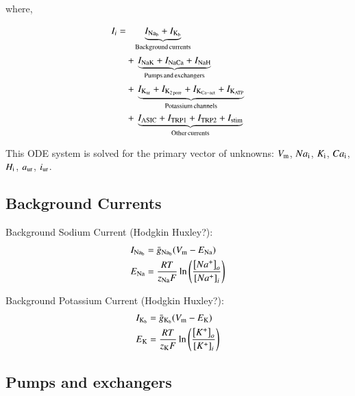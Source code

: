 \noindent where,

\begin{displaymath}
    \begin{split}
      I_{i} =
      & \phantom{+\,} \underbrace{I_{\rm Na_b} + I_{\rm K_b}}_{\rm
        Background\, currents}\\
      & +\, \underbrace{I_{\rm NaK} + I_{\rm NaCa} + I_{\rm NaH}}_{\rm
        Pumps\, and\, exchangers}\\
      & +\, \underbrace{I_{\rm K_{ur}} + I_{\rm K_{2\, pore}} + I_{\rm
          K_{Ca-act}} + I_{\rm K_{ATP}}}_{\rm Potassium\, channels}\\
      & +\, \underbrace{I_{\rm ASIC} + I_{\rm TRP1} + I_{\rm TRP2} +
        I_{\rm stim}}_{\rm Other\, currents}
    \end{split}
\end{displaymath}

This ODE system is solved for the primary vector of unknowns: $V_{\rm
m}$, $Na_{\rm i}$, $K_{\rm i}$, $Ca_{\rm i}$, $H_{\rm i}$, $a_{\rm
ur}$, $i_{\rm ur}$.

\subsection{Background Currents}
\label{sec:background-currents}

Background Sodium Current (Hodgkin Huxley?):
\begin{equation}
  \begin{split}
    I_{\rm Na_b} & = \bar{g}_{\rm Na_b} (V_{\rm m} - E_{\rm Na})\\
    E_{\rm Na} & =  \frac{R T}{z_{\rm Na} F}
    \ln\left(\frac{\left[Na^{+}\right]_{o}}
      {\left[Na^{+}\right]_{i}}\right)
  \end{split}
\end{equation}

Background Potassium Current (Hodgkin Huxley?):
\begin{equation}
  \begin{split}
    I_{\rm K_b} & = \bar{g}_{\rm K_b} (V_{\rm m} - E_{\rm K})\\
    E_{\rm K} & =  \frac{R T}{z_{\rm K} F}
    \ln\left(\frac{\left[K^{+}\right]_{o}}
      {\left[K^{+}\right]_{i}}\right)
  \end{split}
\end{equation}

\subsection{Pumps and exchangers}
\label{sec:pumps-and-exchangers}

